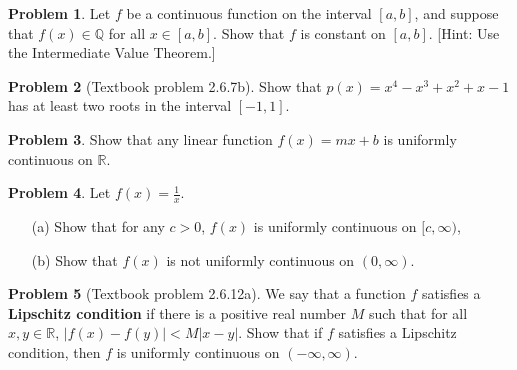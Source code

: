 \documentclass[12pt]{article}
\newcommand{\R}{{\mathbb R}}
\newcommand{\Q}{{\mathbb Q}}
\theoremstyle{definition}
\newtheorem{problem}{Problem}
\newenvironment{answer}{\par\medskip\bgroup\color{darkblue}}{\egroup\medskip}
\begin{document}
\begin{answer}
\end{answer}



\begin{problem}
Let $f$ be a continuous function on the interval $[a,b]$, and suppose that $f(x)\in\Q$ for
all $x\in[a,b]$.  Show that $f$ is constant on $[a,b]$.  [Hint: Use the Intermediate
Value Theorem.]
\end{problem}

\begin{answer}
\end{answer}



\begin{problem}[Textbook problem 2.6.7b]
Show that $p(x)=x^4-x^3+x^2+x-1$ has at least two roots in the interval $[-1,1]$.
\end{problem}

\begin{answer}
\end{answer}



\begin{problem}
Show that any linear function $f(x) = mx+b$ is uniformly continuous on $\R$.
\end{problem}

\begin{answer}
\end{answer}


\begin{problem}
Let $f(x)=\frac{1}{x}$.
\begin{itemize}
\item[(a)] Show that  for any $c>0$, $f(x)$ is uniformly continuous on $[c,\infty)$,
\item[(b)] Show that $f(x)$ is not uniformly continuous on $(0,\infty)$.
\end{itemize}
\end{problem}

\begin{answer}
\end{answer}



\begin{problem}[Textbook problem 2.6.12a]
We say that a function $f$ satisfies a \textbf{Lipschitz condition} if there is a positive
real number $M$ such that for all $x,y\in\R$, $|f(x)-f(y)|<M|x-y|$.
Show that if $f$ satisfies a Lipschitz condition, then $f$ is uniformly 
continuous on $(-\infty,\infty)$. 
\end{problem}

\begin{answer}
\end{answer}
\end{document}
